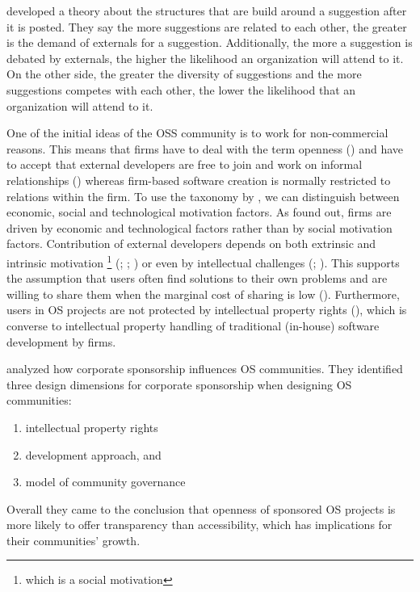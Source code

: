 \cite{piezunka2013study} developed a theory about the structures that are build around a suggestion after it is posted. They say the more suggestions are related to each other, the greater is the demand of externals for a suggestion. Additionally, the more a suggestion is debated by externals, the higher the likelihood an organization will attend to it. On the other side, the greater the diversity of suggestions and the more suggestions competes with each other, the lower the likelihood that an organization will attend to it.

One of the initial ideas of the OSS community is to work for non-commercial reasons. This means that firms have to deal with the term openness (\cite{dahlander2010open}) and have to accept that external developers are free to join and work on informal relationships (\cite{dahlander2005relationships}) whereas firm-based software creation is normally restricted to relations within the firm. To use the taxonomy by \cite{feller2002understanding}, we can distinguish between economic, social and technological motivation factors. As \cite{bonaccorsi2006comparing} found out, firms are driven by economic and technological factors rather than by social motivation factors. Contribution of external developers depends on both extrinsic and intrinsic motivation \footnote{which is a social motivation} (\cite{hertel2003motivation}; \cite{hars2001working}; \cite{lakhani2002boston}) or even by intellectual challenges (\cite{raymond2001cathedral}; \cite{hertel2003motivation}). This supports the assumption that users often find solutions to their own problems and are willing to share them when the marginal cost of sharing is low (\cite{von1976dominant}). Furthermore, users in OS projects are not protected by intellectual property rights (\cite{waguespack2004penguins}), which is converse to intellectual property handling of traditional (in-house) software development by firms.

\cite{west2008role} analyzed how corporate sponsorship influences OS communities. They identified three design dimensions for corporate sponsorship when designing OS communities:

\begin{enumerate}
	\item intellectual property rights
	\item development approach, and
	\item model of community governance
\end{enumerate}

Overall they came to the conclusion that openness of sponsored OS projects is more likely to offer transparency than accessibility, which has implications for their communities' growth.

